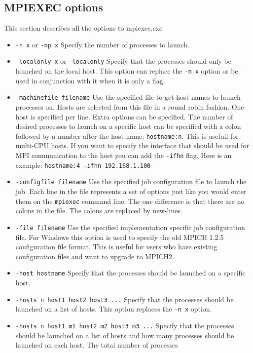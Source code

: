 \documentclass[dvipdfm,11pt]{article}
\begin{document}
\subsection{MPIEXEC options}
This section describes all the options to mpiexec.exe

\begin{itemize}
\item \texttt{-n x} or \texttt{-np x}
Specify the number of processes to launch.
\item \texttt{-localonly x} or \texttt{-localonly}
Specify that the processes should only be launched on the local host.  This
option can replace the \texttt{-n x} option or be used in conjunction with it
when it is only a flag.
\item \texttt{-machinefile filename}
Use the specified file to get host names to launch processes on.  Hosts are 
selected from this file in a round robin fashion.  One host is specified per
line.  Extra options can be specified.  The number of desired processes to
launch on a specific host can be specified with a colon followed by a number
after the host name: \texttt{hostname:n}.  This is usefull for multi-CPU hosts.
If you want to specify the interface that should be used for MPI communication
to the host you can add the \texttt{-ifhn} flag.  Here is an example:
\texttt{hostname:4 -ifhn 192.168.1.100}
\item \texttt{-configfile filename}
Use the specified job configuration file to launch the job.  Each line in the
file represents a set of options just like you would enter them on the \texttt{mpiexec}
command line.  The one difference is that there are no colons in the file.  The
colons are replaced by new-lines.
\item \texttt{-file filename}
Use the specified implementation specific job configuration file.  For Windows
this option is used to specify the old MPICH 1.2.5 configuration file format.
This is useful for users who have existing configuration files and want to upgrade
to MPICH2.
\item \texttt{-host hostname}
Specify that the processes should be launched on a specific host.
\item \texttt{-hosts n host1 host2 host3 ...}
Specify that the processes should be launched on a list of hosts.  This option
replaces the \texttt{-n x} option.
\item \texttt{-hosts n host1 m1 host2 m2 host3 m3 ...}
Specify that the processes should be launched on a list of hosts and how many
processes should be launched on each host.  The total number of processes 

\end{itemize}
\end{document}
